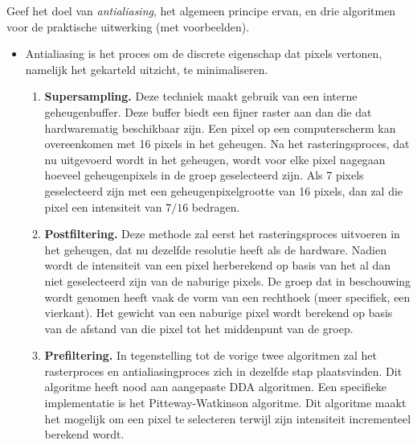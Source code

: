 \documentclass{report}
\begin{document}
\begin{enumerate}
	\vraag
	{
		Geef het doel van \textit{antialiasing}, het algemeen principe ervan, en drie algoritmen voor de praktische uitwerking (met voorbeelden). 
	}
	{
		\begin{itemize}
			\item Antialiasing is het proces om de discrete eigenschap dat pixels vertonen, namelijk het gekarteld uitzicht, te minimaliseren. 
			      \begin{enumerate}
			      	\item \textbf{Supersampling.} Deze techniek maakt gebruik van een interne geheugenbuffer. Deze buffer biedt een fijner raster aan dan die dat hardwarematig beschikbaar zijn. Een pixel op een computerscherm kan overeenkomen met 16 pixels in het geheugen. Na het rasteringsproces, dat nu uitgevoerd wordt in het geheugen, wordt voor elke pixel nagegaan hoeveel geheugenpixels in de groep geselecteerd zijn. Als 7 pixels geselecteerd zijn met een geheugenpixelgrootte van 16 pixels, dan zal die pixel een intensiteit van $7/16$ bedragen.
			      	\item \textbf{Postfiltering.} Deze methode zal eerst het rasteringsproces uitvoeren in het geheugen, dat nu dezelfde resolutie heeft als de hardware. Nadien wordt de intensiteit van een pixel herberekend op basis van het al dan niet geselecteerd zijn van de naburige pixels. De groep dat in beschouwing wordt genomen heeft vaak de vorm van een rechthoek (meer specifiek, een vierkant). Het gewicht van een naburige pixel wordt berekend op basis van de afstand van die pixel tot het middenpunt van de groep.
			      	\item \textbf{Prefiltering.} In tegenstelling tot de vorige twee algoritmen zal het rasterproces en antialiasingproces zich in dezelfde stap plaatsvinden. Dit algoritme heeft nood aan aangepaste DDA algoritmen. Een specifieke implementatie is het Pitteway-Watkinson algoritme. Dit algoritme maakt het mogelijk om een pixel te selecteren terwijl zijn intensiteit incrementeel berekend wordt. 
			      \end{enumerate}
		\end{itemize}
	}
\end{enumerate}
\end{document}
